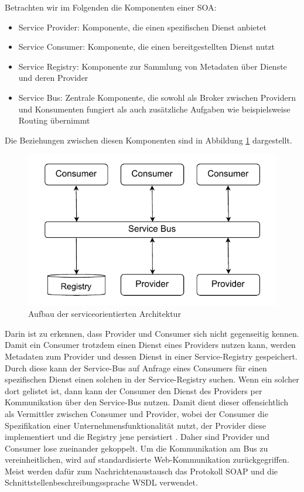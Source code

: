 \documentclass[acmtog]{acmart}
\begin{document}
Betrachten wir im Folgenden die Komponenten einer SOA:
\begin{itemize}
  \item Service Provider: Komponente, die einen spezifischen Dienst anbietet
  \item Service Consumer: Komponente, die einen bereitgestellten Dienst nutzt
  \item Service Registry: Komponente zur Sammlung von Metadaten über Dienste und deren Provider
  \item Service Bus: Zentrale Komponente, die sowohl als Broker zwischen Providern und Konsumenten fungiert als auch zusätzliche Aufgaben wie beispielsweise Routing übernimmt
\end{itemize}

Die Beziehungen zwischen diesen Komponenten sind in Abbildung \ref{fig:soa} dargestellt.
\begin{figure}[!h]
  \centering
  \includegraphics[width=0.8\linewidth]{images/soa/soa.pdf}
  \caption{Aufbau der serviceorientierten Architektur}
  \label{fig:soa}
\end{figure}
Darin ist zu erkennen, dass Provider und Consumer sich nicht gegenseitig kennen.
Damit ein Consumer trotzdem einen Dienst eines Providers nutzen kann, werden Metadaten zum Provider und dessen Dienst in einer Service-Registry gespeichert.
Durch diese kann der Service-Bus auf Anfrage eines Consumers für einen spezifischen Dienst einen solchen in der Service-Registry suchen.
Wenn ein solcher dort gelistet ist, dann kann der Consumer den Dienst des Providers per Kommunikation über den Service-Bus nutzen.
Damit dient dieser offensichtlich als Vermittler zwischen Consumer und Provider, wobei der Consumer die Spezifikation einer Unternehmensfunktionalität nutzt,
der Provider diese implementiert und die Registry jene persistiert \cite[16]{soa2}\cite[19-26]{soa4}.
Daher sind Provider und Consumer lose zueinander gekoppelt.
Um die Kommunikation am Bus zu vereinheitlichen, wird auf standardisierte Web-Kommunikation zurückgegriffen.
Meist werden dafür zum Nachrichtenaustausch das Protokoll SOAP und die Schnittstellenbeschreibungssprache WSDL verwendet. %
\end{document}
